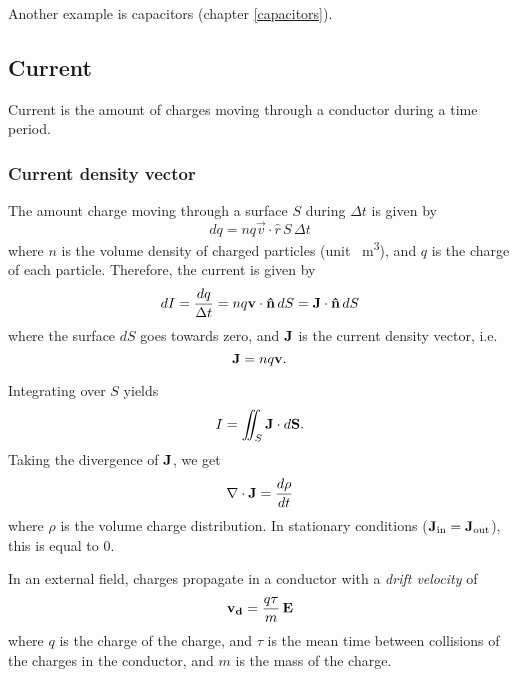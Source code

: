         Another example is capacitors (chapter \ref{capacitors}).
  
\subsection{Current}
    Current is the amount of charges moving through a conductor during a time period. 
    \subsubsection{Current density vector}
        The amount charge moving through a surface $S$ during $\Delta t$ is given by
        \begin{equation}
            dq = nq\vec{v}\cdot \hat{r}\,S \,\Delta t
        \end{equation}
        where $n$ is the volume density of charged particles (unit \si{\per\metre\cubed}), and $q$ is the charge of each particle.
        Therefore, the current is given by
        \begin{equation}
            dI = \frac{dq}{\Delta t} = nq\vec{v}\cdot\hat{n}\, dS = \j\cdot\hat{n}\, dS
        \end{equation}
        where the surface $dS$ goes towards zero, and $\mathbf{J}$ is the current density vector, i.e.
        \begin{equation}
            \mathbf{J} = nq\mathbf{v}.
        \end{equation}
        
        Integrating over $S$ yields
        \begin{equation}
            \label{integrate j equals I}
            I = \iint_S \mathbf{J}\cdot d\mathbf{S}.
        \end{equation}
        Taking the divergence of $\mathbf{J}$, we get
        \begin{equation}
            \label{div j}
            \nabla \cdot \mathbf{J} = \frac{d\rho}{dt}
        \end{equation}
        where $\rho$ is the volume charge distribution.
        In stationary conditions ($\mathbf{J}_{\text{in}} = \mathbf{J}_{\text{out}}$), this is equal to 0. 
    
        In an external field, charges propagate in a conductor with a \textit{drift velocity} of
        \begin{equation}
            \mathbf{v_d} = \frac{q\tau}{m}\,\mathbf{E}
        \end{equation}
        where $q$ is the charge of the charge, and $\tau$ is the mean time between collisions of the charges in the conductor, 
        and $m$ is the mass of the charge.
        
